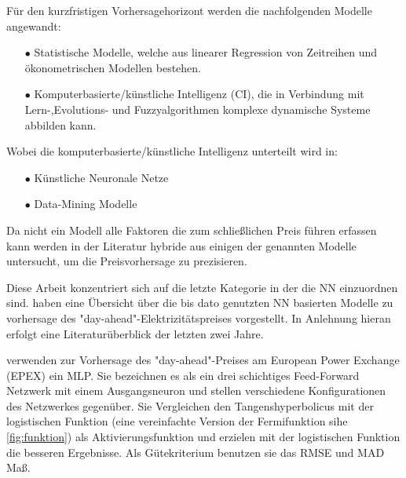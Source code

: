 Für den kurzfristigen Vorhersagehorizont werden die nachfolgenden Modelle angewandt:
\begin{itemize}
\item[\textbf{$\bullet$}]%
Statistische Modelle, welche aus linearer Regression von Zeitreihen und ökonometrischen Modellen bestehen.

\item[\textbf{$\bullet$}]%
Komputerbasierte/künstliche Intelligenz (CI), die in Verbindung mit Lern-,Evolutions- und Fuzzyalgorithmen komplexe dynamische Systeme abbilden kann.
\end{itemize}

Wobei die komputerbasierte/künstliche Intelligenz unterteilt wird in: 
\begin{itemize}
\item[\textbf{$\bullet$}]%
Künstliche Neuronale Netze

\item[\textbf{$\bullet$}]%
Data-Mining Modelle
\end{itemize}

Da nicht ein Modell alle Faktoren die zum schließlichen Preis führen erfassen kann werden in der Literatur hybride aus einigen der genannten Modelle untersucht, um die Preisvorhersage zu prezisieren.


Diese Arbeit konzentriert sich auf die letzte Kategorie in der die NN einzuordnen sind. \citet{Panapakidis2016} haben eine Übersicht über die bis dato genutzten NN basierten Modelle zu vorhersage des "day-ahead"\--Elektrizitätspreises vorgestellt. In Anlehnung hieran erfolgt eine Literaturüberblick der letzten zwei Jahre.







\citet{Keles2016} verwenden zur Vorhersage des "day-ahead"\--Preises am European Power Exchange (EPEX) ein MLP. Sie bezeichnen es als ein drei schichtiges Feed-Forward Netzwerk mit einem Ausgangsneuron und stellen verschiedene Konfigurationen des Netzwerkes gegenüber. Sie Vergleichen den Tangenshyperbolicus mit der logistischen Funktion (eine vereinfachte Version der Fermifunktion sihe \autoref{fig:funktion}) als Aktivierungsfunktion und erzielen mit der logistischen Funktion die besseren Ergebnisse. Als Gütekriterium benutzen sie das RMSE und MAD Maß.

